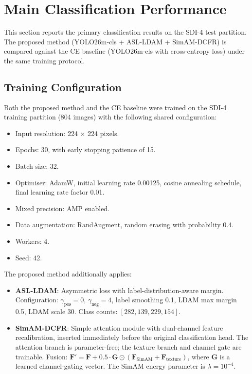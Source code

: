 
\section{Main Classification Performance}
\label{sec:main-classification}

This section reports the primary classification results on the SDI-4 test partition. The proposed method (YOLO26m-cls + ASL-LDAM + SimAM-DCFR) is compared against the CE baseline (YOLO26m-cls with cross-entropy loss) under the same training protocol.

\subsection{Training Configuration}
\label{sec:training-config}

Both the proposed method and the CE baseline were trained on the SDI-4 training partition (804 images) with the following shared configuration:

\begin{itemize}
    \item Input resolution: 224 $\times$ 224 pixels.
    \item Epochs: 30, with early stopping patience of 15.
    \item Batch size: 32.
    \item Optimiser: AdamW, initial learning rate 0.00125, cosine annealing schedule, final learning rate factor 0.01.
    \item Mixed precision: AMP enabled.
    \item Data augmentation: RandAugment, random erasing with probability 0.4.
    \item Workers: 4.
    \item Seed: 42.
\end{itemize}

The proposed method additionally applies:

\begin{itemize}
    \item \textbf{ASL-LDAM}: Asymmetric loss with label-distribution-aware margin. Configuration: $\gamma_{\text{pos}} = 0$, $\gamma_{\text{neg}} = 4$, label smoothing 0.1, LDAM max margin 0.5, LDAM scale 30. Class counts: $[282, 139, 229, 154]$.
    \item \textbf{SimAM-DCFR}: Simple attention module with dual-channel feature recalibration, inserted immediately before the original classification head. The attention branch is parameter-free; the texture branch and channel gate are trainable. Fusion: $\mathbf{F}' = \mathbf{F} + 0.5 \cdot \mathbf{G} \odot (\mathbf{F}_{\text{SimAM}} + \mathbf{F}_{\text{texture}})$, where $\mathbf{G}$ is a learned channel-gating vector. The SimAM energy parameter is $\lambda = 10^{-4}$.
\end{itemize}

